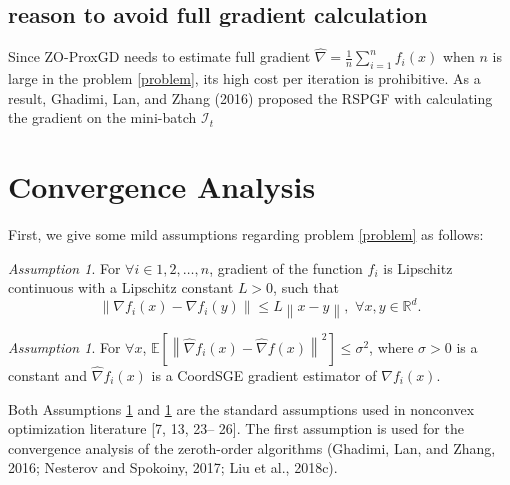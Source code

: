 \documentclass{article}
\newcommand*{\R}{\mathbb{R}}
\newcommand*{\E}{\mathbb{E}}
\newcommand{\norm}[1]{\left\lVert#1\right\rVert}
\theoremstyle{definition}
\theoremstyle{remark}
\newtheorem{assumption}[theorem]{Assumption}
\begin{document}
\subsection{reason to avoid full gradient calculation}
{\color{Green}
Since ZO-ProxGD needs to estimate full gradient
$\hat{\nabla}=\frac{1}{n}\sum_{i=1}^n f_i(x)$ when $n$ is large in the problem \eqref{problem}, its high cost per iteration is prohibitive. As a result, Ghadimi, Lan, and Zhang (2016) proposed the RSPGF with calculating the gradient on the mini-batch $\mathcal{I}_t$
}

\section{Convergence Analysis}
{\color{Green}
First, we give some
mild assumptions regarding problem \eqref{problem} as follows:
}
\begin{assumption}\label{Lip-Zoo}
For $\forall i\in{1,2,\ldots,n}$, gradient of the function $f_i$ is Lipschitz continuous with a Lipschitz constant $L > 0$, such that 
\[
\norm{\nabla f_i(x) - \nabla f_i(y)}\leq L \norm{x-y},\,\,\forall x,y\in\R^d.
\]
\end{assumption}

\begin{assumption}\label{Var-Zoo}
For $\forall x$, $\E\left[\norm{\hat{\nabla} f_i(x) - \hat{\nabla} f(x)}^2\right] \leq \sigma^2$, where $\sigma > 0$ is a constant and $\hat{\nabla} f_i(x)$ is a CoordSGE gradient estimator of $\nabla f_i(x)$.
\end{assumption}
{\color{Green}
{\color{Brown}
Both Assumptions \ref{Lip-Zoo} and \ref{Var-Zoo} are the standard assumptions used in nonconvex optimization literature [7, 13, 23–
26].}
The first assumption is used for the convergence analysis of the zeroth-order algorithms (Ghadimi, Lan, and Zhang, 2016; Nesterov and Spokoiny, 2017; Liu et al., 2018c).}
\end{document}
